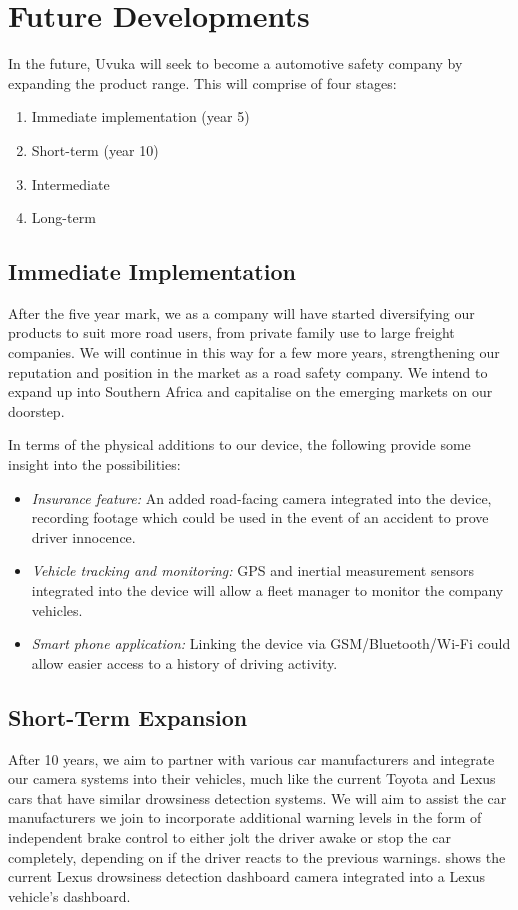 \section{Future Developments}
In the future, Uvuka will seek to become a automotive safety company by expanding the product range. This will comprise of four stages:
\begin{enumerate}
\item Immediate implementation (year 5)
\item Short-term (year 10)
\item Intermediate
\item Long-term
\end{enumerate}

\subsection{Immediate Implementation}
After the five year mark, we as a company will have started diversifying our products to suit more road users, from private family use to large freight companies. We will continue in this way for a few more years, strengthening our reputation and position in the market as a road safety company. We intend to expand up into Southern Africa and capitalise on the emerging markets on our doorstep.

In terms of the physical additions to our device, the following provide some insight into the possibilities:
\begin{itemize}
\item \textit{Insurance feature:} An added road-facing camera integrated into the device, recording footage which could be used in the event of an accident to prove driver innocence.

\item \textit{Vehicle tracking and monitoring:} GPS and inertial measurement sensors integrated into the device will allow a fleet manager to monitor the company vehicles.

\item \textit{Smart phone application:} Linking the device via GSM/Bluetooth/Wi-Fi could allow easier access to a history of driving activity.
\end{itemize}

\newpage 
\subsection{Short-Term Expansion}
After 10 years, we aim to partner with various car manufacturers and integrate our camera systems into their vehicles, much like the current Toyota \cite{toyota} and Lexus \cite{lexus} cars that have similar drowsiness detection systems. We will aim to assist the car manufacturers we join to incorporate additional warning levels in the form of independent brake control to either jolt the driver awake or stop the car completely, depending on if the driver reacts to the previous warnings.  shows the current Lexus drowsiness detection dashboard camera integrated into a Lexus vehicle's dashboard.

